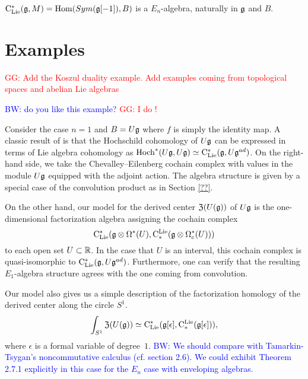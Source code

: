 \documentclass[11pt]{amsart}
\numberwithin{equation}{section}
\def\brian{\textcolor{blue}{BW: }\textcolor{blue}}
\def\greg{\textcolor{red}{GG: }\textcolor{red}}
\begin{document}
\begin{lmm}
 ${\rm C}_{\rm Lie}^*(\mathfrak g, M) = {\rm Hom} (Sym(\mathfrak g[-1]), B)$ is a $E_n$-algebra, naturally in $\mathfrak g$ and $B$.
\end{lmm}



\section{Examples}


\greg{Add the Koszul duality example. Add examples coming from topological spaces and abelian Lie algebras}

\brian{do you like this example?} \greg{I do !}
\begin{eg}\label{eg: TT}
Consider the case $n=1$ and $B = U \mathfrak g$ where $f$ is simply the identity map. 
A classic result of \cite{HochSerre} is that the Hochschild cohomology of $U \mathfrak g$ can be expressed in terms of Lie algebra cohomology as ${\rm Hoch}^*(U\mathfrak g,U\mathfrak g) \simeq {\rm C}_{\rm Lie}^*(\mathfrak g, U\mathfrak g^{ad})$. 
On the right-hand side, we take the Chevalley--Eilenberg cochain complex with values in the module $U \mathfrak g$ equipped with the adjoint action.
The algebra structure is given by a special case of the convolution product as in Section \ref{??}. 

On the other hand, our model for the derived center ${\frak Z}(U(\mathfrak g))$ of $U \mathfrak g$ is the one-dimensional factorization algebra assigning the cochain complex
\[
{\rm C}_{\rm Lie}^*(\mathfrak g \otimes \Omega^*(U), {\rm C}^{\rm Lie}_*( \mathfrak g \otimes \Omega^*_c(U)))
\]
to each open set $U \subset \mathbb R$.
In the case that $U$ is an interval, this cochain complex is quasi-isomorphic to ${\rm C}_{\rm Lie}^* (\mathfrak g , U\mathfrak g^{ad})$.
Furthermore, one can verify that the resulting $E_1$-algebra structure agrees with the one coming from convolution. 

Our model also gives us a simple description of the factorization homology of the derived center along the circle $S^1$.
\[
\int_{S^1} {\frak Z}(U(\mathfrak g)) \simeq {\rm C}_{\rm Lie}^*(\mathfrak g[\epsilon], {\rm C}^{\rm Lie}_*( \mathfrak g[\epsilon])),
\]
where $\epsilon$ is a formal variable of degree~$1$. 
\brian{We should compare with Tamarkin-Tsygan's noncommutative calculus (cf. section 2.6).
We could exhibit Theorem 2.7.1 explicitly in this case for the $E_n$ case with enveloping algebras.}
\end{eg}
\end{document}
